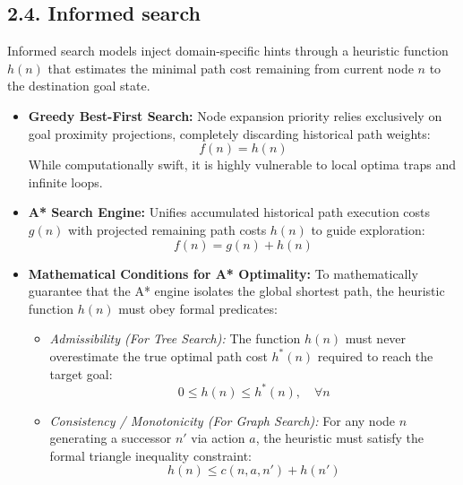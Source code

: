 \documentclass[../main.tex]{subfiles}
\begin{document}
\subsection{2.4. Informed search}
Informed search models inject domain-specific hints through a heuristic function $h(n)$ that estimates the minimal path cost remaining from current node $n$ to the destination goal state.
\begin{itemize}
    \item \textbf{Greedy Best-First Search:} Node expansion priority relies exclusively on goal proximity projections, completely discarding historical path weights:
    \begin{equation}
        f(n) = h(n)
    \end{equation}
    While computationally swift, it is highly vulnerable to local optima traps and infinite loops.
    \item \textbf{A* Search Engine:} Unifies accumulated historical path execution costs $g(n)$ with projected remaining path costs $h(n)$ to guide exploration:
    \begin{equation}
        f(n) = g(n) + h(n)
    \end{equation}
    \item \textbf{Mathematical Conditions for A* Optimality:} To mathematically guarantee that the A* engine isolates the global shortest path, the heuristic function $h(n)$ must obey formal predicates:
    \begin{itemize}
        \item \textit{Admissibility (For Tree Search):} The function $h(n)$ must never overestimate the true optimal path cost $h^*(n)$ required to reach the target goal:
        \begin{equation}
            0 \le h(n) \le h^*(n), \quad \forall n
        \end{equation}
        \item \textit{Consistency / Monotonicity (For Graph Search):} For any node $n$ generating a successor $n'$ via action $a$, the heuristic must satisfy the formal triangle inequality constraint:
        \begin{equation}
            h(n) \le c(n, a, n') + h(n')
        \end{equation}
    \end{itemize}
\end{itemize}
\end{document}
